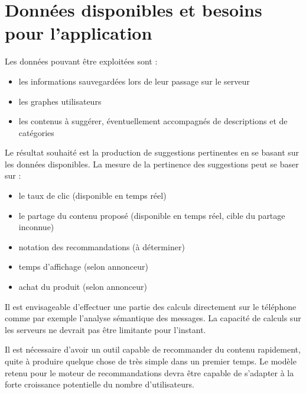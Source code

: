 \documentclass[a4paper]{article}
\begin{document}
\section{Donn\'ees disponibles et besoins pour l'application}
Les donn\'ees pouvant être exploit\'ees sont :
\begin{itemize}
    \item les informations sauvegard\'ees lors de leur passage sur le serveur
    \item les graphes utilisateurs
    \item les contenus à sugg\'erer, \'eventuellement accompagn\'es de
        descriptions et de cat\'egories
\end{itemize}
Le r\'esultat souhait\'e est la production de suggestions pertinentes en se
basant sur les donn\'ees disponibles. La mesure de la pertinence des
suggestions peut se baser sur :
\begin{itemize}
    \item le taux de clic (disponible en temps r\'eel)
    \item le partage du contenu propos\'e (disponible en temps r\'eel,
        cible du partage inconnue)
    \item notation des recommandations (à d\'eterminer)
    \item temps d'affichage (selon annonceur)
    \item achat du produit (selon annonceur)
\end{itemize}
Il est envisageable d'effectuer une partie des calculs directement sur le
t\'el\'ephone comme par exemple l'analyse s\'emantique des messages. La
capacit\'e de calculs sur les serveurs ne devrait pas être limitante pour
l'instant.

Il est n\'ecessaire d'avoir un outil capable de recommander du contenu
rapidement, quite à produire quelque chose de très simple dans un premier
temps.
Le modèle retenu pour le moteur de recommandations devra être capable de
s'adapter à la forte croissance potentielle du nombre d'utilisateurs.
\end{document}
